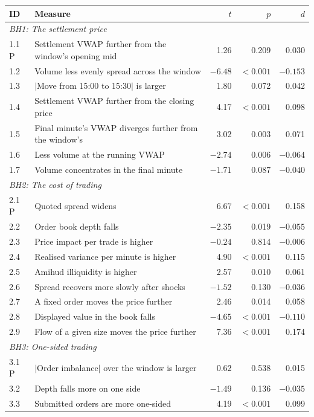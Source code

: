 \documentclass[11pt,a4paper]{article}
\begin{document}
\begin{center}
\footnotesize
\begin{tabularx}{\textwidth}{lXrrr}
\toprule
ID & Measure & $t$ & $p$ & $d$ \\
\midrule
\multicolumn{5}{l}{\textit{BH1: The settlement price}} \\
1.1 P & Settlement VWAP further from the window's opening mid & 1.26 & 0.209 & 0.030 \\
1.2 & Volume less evenly spread across the window & $-6.48$ & $<0.001$ & $-0.153$ \\
1.3 & $|$Move from 15:00 to 15:30$|$ is larger & 1.80 & 0.072 & 0.042 \\
1.4 & Settlement VWAP further from the closing price & 4.17 & $<0.001$ & 0.098 \\
1.5 & Final minute's VWAP diverges further from the window's & 3.02 & 0.003 & 0.071 \\
1.6 & Less volume at the running VWAP & $-2.74$ & 0.006 & $-0.064$ \\
1.7 & Volume concentrates in the final minute & $-1.71$ & 0.087 & $-0.040$ \\
\multicolumn{5}{l}{\textit{BH2: The cost of trading}} \\
2.1 P & Quoted spread widens & 6.67 & $<0.001$ & 0.158 \\
2.2 & Order book depth falls & $-2.35$ & 0.019 & $-0.055$ \\
2.3 & Price impact per trade is higher & $-0.24$ & 0.814 & $-0.006$ \\
2.4 & Realised variance per minute is higher & 4.90 & $<0.001$ & 0.115 \\
2.5 & Amihud illiquidity is higher & 2.57 & 0.010 & 0.061 \\
2.6 & Spread recovers more slowly after shocks & $-1.52$ & 0.130 & $-0.036$ \\
2.7 & A fixed order moves the price further & 2.46 & 0.014 & 0.058 \\
2.8 & Displayed value in the book falls & $-4.65$ & $<0.001$ & $-0.110$ \\
2.9 & Flow of a given size moves the price further & 7.36 & $<0.001$ & 0.174 \\
\multicolumn{5}{l}{\textit{BH3: One-sided trading}} \\
3.1 P & $|$Order imbalance$|$ over the window is larger & 0.62 & 0.538 & 0.015 \\
3.2 & Depth falls more on one side & $-1.49$ & 0.136 & $-0.035$ \\
3.3 & Submitted orders are more one-sided & 4.19 & $<0.001$ & 0.099 \\

\end{tabularx}
\end{center}
\end{document}
